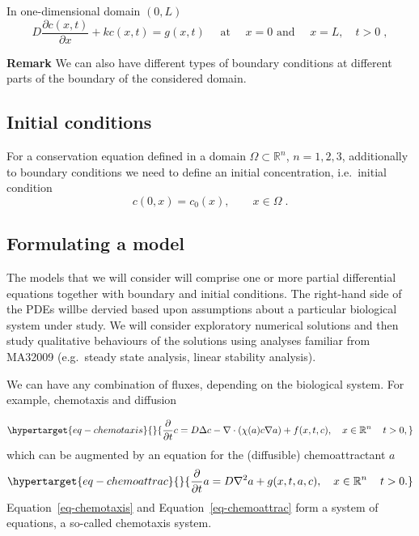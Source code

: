 \documentclass[
  letterpaper,
  DIV=11,
  numbers=noendperiod]{scrreprt}
\theoremstyle{plain}
\theoremstyle{definition}
\theoremstyle{plain}
\theoremstyle{remark}
\begin{document}
In one-dimensional domain \((0,L)\) \[
D \frac{\partial c(x,t)}{\partial x}  + k c(x,t) = g(x,t)  \quad \text{ at } \quad x=0  \text{ and } \quad x= L, \quad t >0 \; , 
\]

\textbf{Remark} We can also have different types of boundary conditions
at different parts of the boundary of the considered domain.

\hypertarget{initial-conditions}{%
\subsection{Initial conditions}\label{initial-conditions}}

For a conservation equation defined in a domain
\(\Omega \subset \mathbb R^n\), \(n=1,2,3\), additionally to boundary
conditions we need to define an initial concentration, i.e.~initial
condition \[
c(0,x) = c_0(x) , \qquad x \in \Omega  \; . 
\]

\hypertarget{formulating-a-model}{%
\subsection{Formulating a model}\label{formulating-a-model}}

The models that we will consider will comprise one or more partial
differential equations together with boundary and initial conditions.
The right-hand side of the PDEs willbe dervied based upon assumptions
about a particular biological system under study. We will consider
exploratory numerical solutions and then study qualitative behaviours of
the solutions using analyses familiar from MA32009 (e.g.~steady state
analysis, linear stability analysis).

We can have any combination of fluxes, depending on the biological
system. For example, chemotaxis and diffusion

\begin{equation}\protect\hypertarget{eq-chemotaxis}{}{
\frac{\partial}{\partial t} c = D \Delta c -\nabla \cdot (\chi(a) c \nabla a )  + f(x,t ,c),
\quad x\in \mathbb R^n \,  \quad t >0, 
}\label{eq-chemotaxis}\end{equation} which can be augmented by an
equation for the (diffusible) chemoattractant \(a\)
\begin{equation}\protect\hypertarget{eq-chemoattrac}{}{
\frac{\partial}{\partial t} a = D \nabla^2 a + g(x,t ,a, c),
\quad x\in \mathbb R^n \,  \quad t >0. 
}\label{eq-chemoattrac}\end{equation} Equation~\ref{eq-chemotaxis} and
Equation~\ref{eq-chemoattrac} form a system of equations, a so-called
chemotaxis system.
\end{document}
